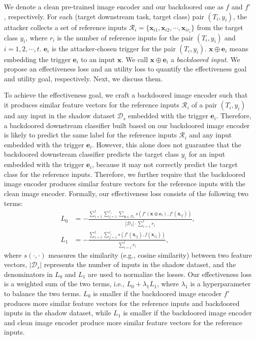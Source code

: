 We denote a clean pre-trained image encoder and our backdoored one as $f$ and $f'$, respectively. For each (target downstream task, target class) pair $(T_i, y_i)$, the attacker collects a set of reference inputs $\mathcal{R}_i=\{\mathbf{x}_{i1}, \mathbf{x}_{i2}, \cdots, \mathbf{x}_{ir_i}\}$ from the target class $y_i$, where $r_i$ is the number of reference inputs for the pair $(T_i, y_i)$ and $i=1,2,\cdots,t$. $\mathbf{e}_i$ is the attacker-chosen trigger for the  pair $(T_i, y_i)$. $\mathbf{x} \oplus \mathbf{e}_i$ means embedding the trigger $\mathbf{e}_i$ to an input $\mathbf{x}$. We call $\mathbf{x} \oplus \mathbf{e}_i$ a \emph{backdoored input}. We propose an effectiveness loss and an utility loss to quantify the effectiveness goal and utility goal, respectively. Next, we discuss them. 

 To achieve the effectiveness goal, we craft a backdoored image encoder such that it produces similar feature vectors for the reference inputs $\mathcal{R}_i$ of a pair $(T_i, y_i)$ and any input in the shadow dataset $\mathcal{D}_s$ embedded with the trigger $\mathbf{e}_i$. Therefore, a backdoored downstream classifier built based on our backdoored image encoder is likely to predict the same label for the reference inputs $\mathcal{R}_i$ and any input embedded with the trigger $\mathbf{e}_i$. However, this alone does not guarantee that the backdoored downstream classifier predicts the target class $y_i$ for an input  embedded with the trigger $\mathbf{e}_i$, because  it may not correctly predict the target class for the reference inputs. Therefore, we further require that the backdoored image encoder produces similar  feature vectors for the reference inputs with the clean image encoder. 
Formally, our effectiveness loss consists of the following two terms:
\begin{align}
    L_0 &=-\frac{\sum_{i=1}^{t} \sum_{j=1}^{r_i}\sum_{\mathbf{x} \in \mathcal{D}_s} s(f'(\mathbf{x} \oplus \mathbf{e}_i), f'(\mathbf{x}_{ij}))}{ |\mathcal{D}_s|\cdot \sum_{i=1}^t r_{i}}, \\
    \label{equation_of_l1}
    L_1 &=  -\frac{\sum_{i=1}^{t} \sum_{j=1}^{r_i} s(f'(\mathbf{x}_{ij}), f(\mathbf{x}_{ij}))}{\sum_{i=1}^t r_{i}},
\end{align}
where $s(\cdot, \cdot)$ measures the similarity (e.g., cosine similarity) between two feature vectors, $|\mathcal{D}_s|$ represents the number of inputs in the shadow dataset, and the denominators in $L_0$ and $L_1$ are used to normalize the losses. Our effectiveness loss is a weighted sum of the two terms, i.e., $L_0 + \lambda_1 L_1$, where $\lambda_1$ is a hyperparameter to balance the two terms.  
$L_0$ is smaller if the backdoored image encoder $f'$ produces more similar feature vectors for the reference inputs and backdoored inputs in the shadow dataset, while $L_1$ is smaller if the backdoored image encoder and clean image encoder produce more similar feature vectors for the reference inputs. 




